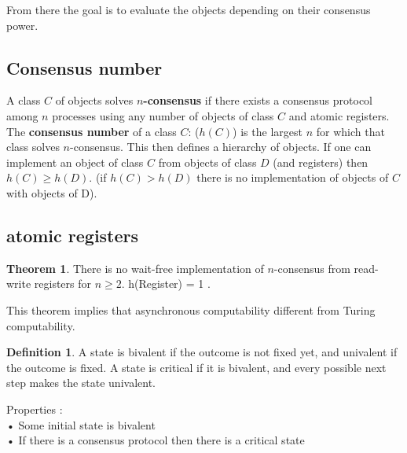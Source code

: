 \documentclass{article}
\theoremstyle{definition}
\newtheorem{definition}{Definition}[section]
\newtheorem{theorem}{Theorem}
\begin{document}
From there the goal is to evaluate the objects depending on their consensus power.

\subsection{Consensus number}

A class $C$ of objects solves \textbf{$n$-consensus} if there exists a consensus protocol among $n$ processes using any number of objects of class $C$ and atomic registers. The \textbf{consensus number} of a class $C$: ($h(C)$) is the largest $n$ for which that class solves $n$-consensus. This then defines a hierarchy of objects. If one can implement an object of class $C$ from objects of class $D$ (and registers) then $h(C) \geq h(D)$. (if $h(C)>h(D)$ there is no implementation of objects of $C$ with objects of D).

\subsection{atomic registers}

\begin{theorem}
There is no wait-free implementation of $n$-consensus from read-write registers for $n \geq 2$. h(Register) = 1 .
\end{theorem}

This theorem implies that asynchronous computability different from Turing computability.

\begin{definition}
A state is bivalent if the outcome is not fixed yet, and univalent if the outcome is fixed. A state is critical if it is bivalent, and every possible next step makes the state univalent.
\end{definition}

Properties :\\
• Some initial state is bivalent\\
• If there is a consensus protocol then there is a critical state\\
\end{document}
